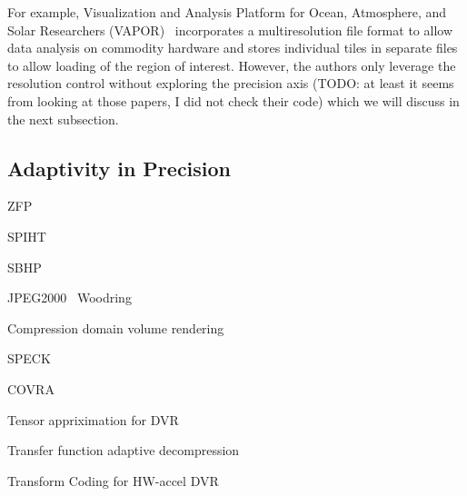 For example, Visualization and Analysis Platform for Ocean, Atmosphere, and Solar Researchers
(VAPOR)~\cite{multires_toolkit2003, vapor2007} incorporates a multiresolution file
format to allow data analysis on commodity hardware and stores individual tiles in
separate files to allow loading of the region of interest.
However, the authors only leverage the resolution control without exploring the precision axis
(TODO: at least it seems from looking at those papers, I did not check their code) which
we will discuss in the next subsection.




\subsection{Adaptivity in Precision}

ZFP~\cite{zfp2014}


SPIHT~\cite{spiht1996}


SBHP~\cite{sbhp2000}

JPEG2000~\cite{jpeg2001}
Woodring~\cite{woodring2011}

Compression domain volume rendering~\cite{compression_domain2003}

SPECK~\cite{speck2004}

COVRA~\cite{covra2012}

Tensor appriximation for DVR~\cite{tensor_dvr2015}

Transfer function adaptive decompression~\cite{tf_decompression2004}

Transform Coding for HW-accel DVR~\cite{hw_dvr2007}

